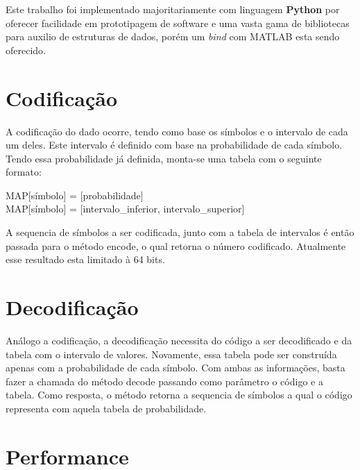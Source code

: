 Este trabalho foi implementado majoritariamente com linguagem \textbf{Python} por oferecer facilidade em prototipagem de software e uma vasta gama de bibliotecas para auxilio de estruturas de dados, porém um \textit{bind} com MATLAB esta sendo oferecido.

\section*{Codificação} %
\label{sub:codificação}

A codificação do dado ocorre, tendo como base os símbolos e o intervalo de cada um deles. Este intervalo é definido com base na probabilidade de cada símbolo. Tendo essa probabilidade já definida, monta-se uma tabela com o seguinte formato:

\begin{center}
{\ttfamily
    MAP[símbolo] = [probabilidade]\\
    MAP[símbolo] = [intervalo\_inferior, intervalo\_superior]
}
\end{center}

A sequencia de símbolos a ser codificada, junto com a tabela de intervalos é então passada para o método {\ttfamily encode}, o qual retorna o número codificado. Atualmente esse resultado esta limitado à 64 bits.

\section*{Decodificação} %
\label{sub:decodificação}
Análogo a codificação, a decodificação necessita do código a ser decodificado e da tabela com o intervalo de valores. Novamente, essa tabela pode ser construída apenas com a probabilidade de cada símbolo. Com ambas as informações, basta fazer a chamada do método {\ttfamily decode} passando como parâmetro o código e a tabela. Como resposta, o método retorna a sequencia de símbolos a qual o código representa com aquela tabela de probabilidade.

\section*{Performance} %
\label{sub:performance}

